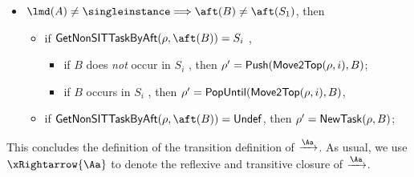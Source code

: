 {\begin{itemize}
           
              \item $\lmd(A) \neq \singleinstance\Longrightarrow\aft(B) \neq \aft(S_1)$,   then
        	    \begin{itemize}
        		\item if ${\sf GetNonSITTaskByAft}(\rho, \aft(B))=S_i$ ,

                    \begin{itemize}
                    	\item if $B$ does \emph{not} occur in $S_i$ , then  $\rho'={\sf Push}({\sf Move2Top}(\rho, i),B)$;
%
                    	\item if $B$ occurs in $S_i$ , then $\rho'={\sf PopUntil}({\sf Move2Top}(\rho, i),B)$,
                    \end{itemize}
                \item if ${\sf GetNonSITTaskByAft}(\rho, \aft(B))={\sf Undef}$, then  $\rho'= {\sf NewTask}(\rho,B )$;
        	\end{itemize}     
\end{itemize}
%
This concludes the definition of the transition definition of $\xrightarrow{\Aa}$. As usual, we use $\xRightarrow{\Aa}$ to denote the reflexive and transitive closure of $\xrightarrow{\Aa}$.


}
